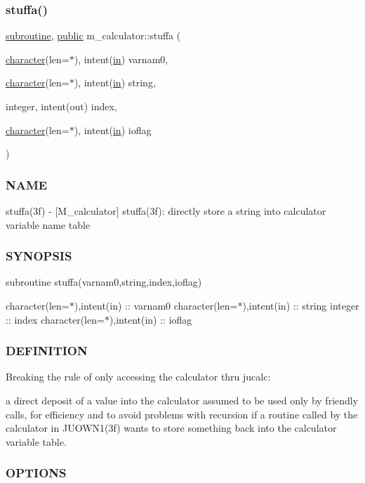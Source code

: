 \subsubsection{\texorpdfstring{stuffa()}{stuffa()}}
{\footnotesize\ttfamily \hyperlink{M__stopwatch_83_8txt_acfbcff50169d691ff02d4a123ed70482}{subroutine}, \hyperlink{M__stopwatch_83_8txt_a2f74811300c361e53b430611a7d1769f}{public} m\+\_\+calculator\+::stuffa (\begin{DoxyParamCaption}\item[{\hyperlink{option__stopwatch_83_8txt_abd4b21fbbd175834027b5224bfe97e66}{character}(len=$\ast$), intent(\hyperlink{M__journal_83_8txt_afce72651d1eed785a2132bee863b2f38}{in})}]{varnam0,  }\item[{\hyperlink{option__stopwatch_83_8txt_abd4b21fbbd175834027b5224bfe97e66}{character}(len=$\ast$), intent(\hyperlink{M__journal_83_8txt_afce72651d1eed785a2132bee863b2f38}{in})}]{string,  }\item[{integer, intent(out)}]{index,  }\item[{\hyperlink{option__stopwatch_83_8txt_abd4b21fbbd175834027b5224bfe97e66}{character}(len=$\ast$), intent(\hyperlink{M__journal_83_8txt_afce72651d1eed785a2132bee863b2f38}{in})}]{ioflag }\end{DoxyParamCaption})}



\subsubsection*{N\+A\+ME}

stuffa(3f) -\/ \mbox{[}M\+\_\+calculator\mbox{]} stuffa(3f)\+: directly store a string into calculator variable name table \subsubsection*{S\+Y\+N\+O\+P\+S\+IS}

subroutine stuffa(varnam0,string,index,ioflag)

character(len=$\ast$),intent(in) \+:\+: varnam0 character(len=$\ast$),intent(in) \+:\+: string integer \+:\+: index character(len=$\ast$),intent(in) \+:\+: ioflag \subsubsection*{D\+E\+F\+I\+N\+I\+T\+I\+ON}

Breaking the rule of only accessing the calculator thru jucalc\+:

a direct deposit of a value into the calculator assumed to be used only by friendly calls, for efficiency and to avoid problems with recursion if a routine called by the calculator in J\+U\+O\+W\+N1(3f) wants to store something back into the calculator variable table. \subsubsection*{O\+P\+T\+I\+O\+NS}

